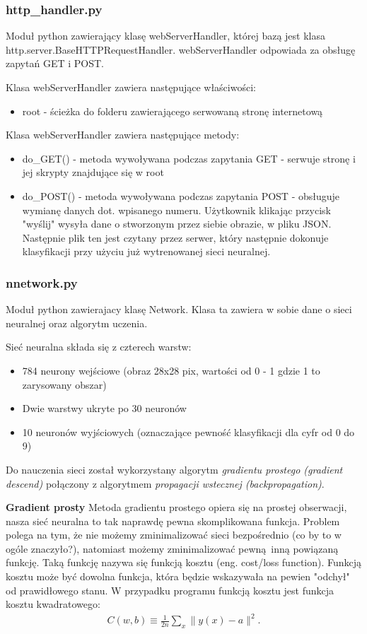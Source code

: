 \documentclass{article}
\begin{document}
\subsubsection{http\_handler.py}
Moduł python zawierający klasę webServerHandler, której bazą jest klasa http.server.BaseHTTPRequestHandler. webServerHandler odpowiada za obsługę zapytań GET i POST.

Klasa webServerHandler zawiera następujące właściwości:
\begin{itemize}
    \item root - ścieżka do folderu zawierającego serwowaną stronę internetową
\end{itemize}

Klasa webServerHandler zawiera następujące metody:
\begin{itemize}
    \item do\_GET() - metoda wywoływana podczas zapytania GET - serwuje stronę i jej skrypty znajdujące się w root
    \item do\_POST() - metoda wywoływana podczas zapytania POST - obsługuje wymianę danych dot. wpisanego numeru. Użytkownik klikając przycisk "wyślij" wysyła dane o stworzonym przez siebie
    obrazie, w pliku JSON. Następnie plik ten jest czytany przez serwer, który następnie dokonuje klasyfikacji przy użyciu już wytrenowanej sieci neuralnej.
\end{itemize}


\subsubsection{nnetwork.py}
Moduł python zawierajacy klasę Network. Klasa ta zawiera w sobie dane o sieci neuralnej oraz algorytm uczenia.

Sieć neuralna składa się z czterech warstw:
\begin{itemize}
    \item 784 neurony wejściowe (obraz 28x28 pix, wartości od 0 - 1 gdzie 1 to zarysowany obszar)
    \item Dwie warstwy ukryte po 30 neuronów
    \item 10 neuronów wyjściowych (oznaczające pewność klasyfikacji dla cyfr od 0 do 9)
\end{itemize}


Do nauczenia sieci został wykorzystany algorytm \textit{gradientu prostego (gradient descend)} połączony z algorytmem \textit{propagacji wstecznej (backpropagation)}.


\textbf{Gradient prosty} 
Metoda gradientu prostego opiera się na prostej obserwacji, nasza sieć neuralna to tak naprawdę pewna skomplikowana funkcja. Problem polega na tym, że 
nie możemy zminimalizować sieci bezpośrednio (co by to w ogóle znaczyło?), natomiast możemy zminimalizować pewną inną powiązaną funkcję. Taką funkcję
nazywa się funkcją kosztu (eng. cost/loss function). Funkcją kosztu może być dowolna funkcja, która będzie wskazywała na pewien "odchył" od prawidłowego stanu.
\newline
W przypadku programu funkcją kosztu jest funkcja kosztu kwadratowego:
\begin{eqnarray}  
    C(w,b) \equiv \frac{1}{2n} \sum_x \| y(x) - a\|^2.
\end{eqnarray}
\end{document}
